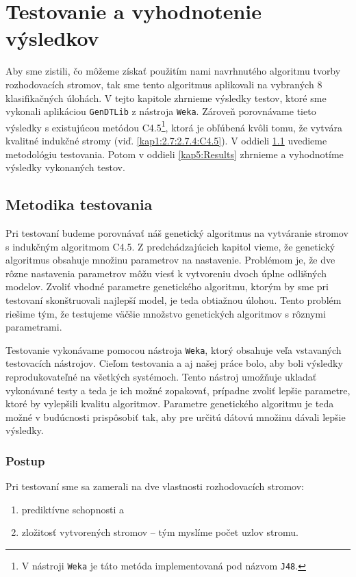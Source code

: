 \chapter{Testovanie a vyhodnotenie výsledkov}\label{kap5:Tests}
Aby sme zistili, čo môžeme získať použitím nami navrhnutého algoritmu tvorby rozhodovacích stromov, tak sme tento algoritmus aplikovali na vybraných 8 klasifikačných úlohách. V tejto kapitole zhrnieme výsledky testov, ktoré sme vykonali aplikáciou \verb|GenDTLib| z nástroja \verb|Weka|. Zároveň porovnávame tieto výsledky s existujúcou metódou C4.5\footnote{V nástroji \texttt{Weka} je táto metóda implementovaná pod názvom \texttt{J48}.}, ktorá je obľúbená kvôli tomu, že vytvára kvalitné indukčné stromy (viď. \ref{kap1:2.7:2.7.4:C4.5}). V oddieli \ref{kap5:Methodology} uvedieme metodológiu testovania. Potom v oddieli \ref{kap5:Results} zhrnieme a vyhodnotíme výsledky vykonaných testov.
\section{Metodika testovania}\label{kap5:Methodology}
Pri testovaní budeme porovnávať náš genetický algoritmus na vytváranie stromov s indukčným algoritmom C4.5. Z predchádzajúcich kapitol vieme, že genetický algoritmus obsahuje množinu parametrov na nastavenie. Problémom je, že dve rôzne nastavenia parametrov môžu viesť k vytvoreniu dvoch úplne odlišných modelov.
Zvoliť vhodné parametre genetického algoritmu, ktorým by sme pri testovaní skonštruovali najlepší model, je teda obtiažnou úlohou. Tento problém riešime tým, že testujeme väčšie množstvo genetických algoritmov s rôznymi parametrami.

Testovanie vykonávame pomocou nástroja \verb|Weka|, ktorý obsahuje veľa vstavaných testovacích nástrojov. Cieľom testovania a aj našej práce bolo, aby boli výsledky reprodukovateľné na všetkých systémoch. Tento nástroj umožňuje ukladať vykonávané testy a teda je ich možné zopakovať, prípadne zvoliť lepšie parametre, ktoré by vylepšili kvalitu algoritmov. Parametre genetického algoritmu je teda možné v budúcnosti prispôsobiť tak, aby pre určitú dátovú množinu dávali lepšie výsledky.

\subsection{Postup}
Pri testovaní sme sa zamerali na dve vlastnosti rozhodovacích stromov:
\begin{enumerate}
\item prediktívne schopnosti a
\item zložitosť vytvorených stromov -- tým myslíme počet uzlov stromu.
\end{enumerate}

